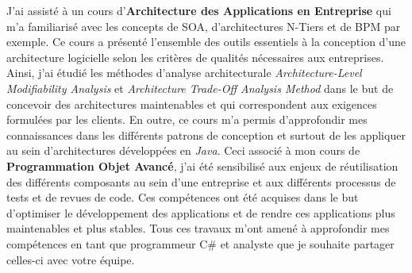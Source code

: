 J'ai assisté à un cours d'\textbf{Architecture des Applications en Entreprise} qui m'a familiarisé avec les concepts de SOA, d'architectures N-Tiers et de BPM par exemple. Ce cours a présenté l'ensemble des outils essentiels à la conception d'une architecture logicielle selon les critères de qualités nécessaires aux entreprises. Ainsi, j'ai étudié les méthodes d'analyse architecturale \textit{Architecture-Level Modifiability Analysis} et \textit{Architecture Trade-Off Analysis Method} dans le but de concevoir des architectures maintenables et qui correspondent aux exigences formulées par les clients. En outre, ce cours m'a permis d'approfondir mes connaissances dans les différents patrons de conception et surtout de les appliquer au sein d'architectures développées en \textit{Java}. Ceci associé à mon cours de \textbf{Programmation Objet Avancé}, j'ai été sensibilisé aux enjeux de réutilisation des différents composants au sein d'une entreprise et aux différents processus de tests et de revues de code. Ces compétences ont été acquises dans le but d'optimiser le développement des applications et de rendre ces applications plus maintenables et plus stables. Tous ces travaux m'ont amené à approfondir mes compétences en tant que programmeur C\# et analyste que je souhaite partager celles-ci avec votre équipe.

\makeletterclosing
